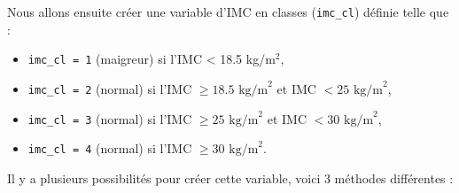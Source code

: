 \documentclass[
]{book}
\providecommand{\tightlist}{%
  \setlength{\itemsep}{0pt}\setlength{\parskip}{0pt}}
\begin{document}
Nous allons ensuite créer une variable d'IMC en classes (\texttt{imc\_cl}) définie telle que :

\begin{itemize}
\tightlist
\item
  \texttt{imc\_cl\ =\ 1} (maigreur) si l'IMC \textless{} 18.5 kg/m\(^2\),
\item
  \texttt{imc\_cl\ =\ 2} (normal) si l'IMC \(\geq 18.5 \text{ kg/m}^2\) et IMC \(< 25 \text{ kg/m}^2\),
\item
  \texttt{imc\_cl\ =\ 3} (normal) si l'IMC \(\geq 25 \text{ kg/m}^2\) et IMC \(< 30 \text{ kg/m}^2\),
\item
  \texttt{imc\_cl\ =\ 4} (normal) si l'IMC \(\geq 30 \text{ kg/m}^2\).
\end{itemize}

Il y a plusieurs possibilités pour créer cette variable, voici 3 méthodes différentes :
\end{document}
